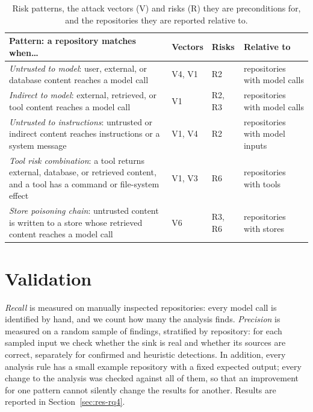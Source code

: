 \begin{table}[t]
\centering
\footnotesize
\renewcommand{\arraystretch}{1.25}
\setlength{\tabcolsep}{4pt}
\caption{Risk patterns, the attack vectors (V) and risks (R) they are preconditions for, and the repositories they are reported relative to.}
\label{tab:df-patterns}
\begin{tabular}{@{}>{\raggedright\arraybackslash}p{}>{\raggedright\arraybackslash}p{}>{\raggedright\arraybackslash}p{}>{\raggedright\arraybackslash}p{}@{}}
\toprule
\textbf{Pattern: a repository matches when\ldots} & \textbf{Vectors} & \textbf{Risks} & \textbf{Relative to} \\
\midrule
\emph{Untrusted to model}: user, external, or database content reaches a model call & V4, V1 & R2 & repositories with model calls \\
\emph{Indirect to model}: external, retrieved, or tool content reaches a model call & V1 & R2, R3 & repositories with model calls \\
\emph{Untrusted to instructions}: untrusted or indirect content reaches instructions or a system message & V1, V4 & R2 & repositories with model inputs \\
\emph{Tool risk combination}: a tool returns external, database, or retrieved content, and a tool has a command or file-system effect & V1, V3 & R6 & repositories with tools \\
\emph{Store poisoning chain}: untrusted content is written to a store whose retrieved content reaches a model call & V6 & R3, R6 & repositories with stores \\
\bottomrule
\end{tabular}
\end{table}

\section{Validation}
\label{sec:df-validation}

\emph{Recall} is measured on manually inspected repositories: every model call is identified by hand, and we count how many the analysis finds. \emph{Precision} is measured on a random sample of findings, stratified by repository: for each sampled input we check whether the sink is real and whether its sources are correct, separately for confirmed and heuristic detections. In addition, every analysis rule has a small example repository with a fixed expected output; every change to the analysis was checked against all of them, so that an improvement for one pattern cannot silently change the results for another. Results are reported in Section~\ref{sec:res-rq4}.

